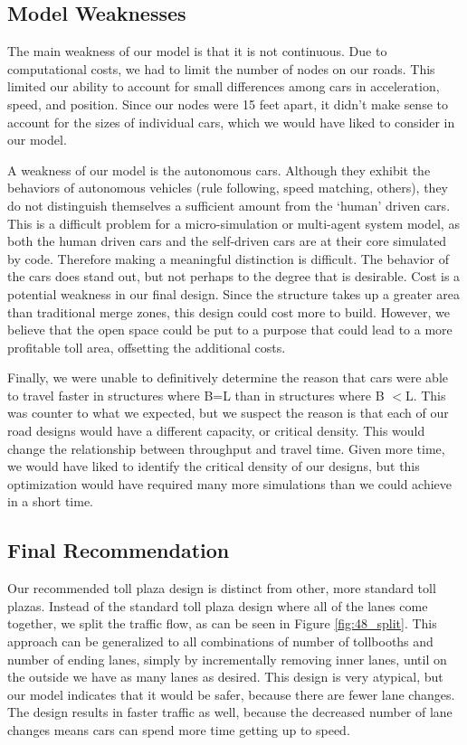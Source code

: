 \documentclass[a4paper, 11pt]{article}
\begin{document}
\subsection{Model Weaknesses}
The main weakness of our model is that it is not continuous.  Due to computational costs, we had to limit the number of nodes on our roads. This limited our ability to account for small differences among cars in acceleration, speed, and position. Since our nodes were 15 feet apart, it didn't make sense to account for the sizes of individual cars, which we would have liked to consider in our model. 

%
%
%
%
%
%


A weakness of our model is the autonomous cars. Although they exhibit the behaviors of autonomous vehicles (rule following, speed matching, others), they do not distinguish themselves a sufficient amount from the `human' driven cars. This is a difficult problem for a micro-simulation or multi-agent system model, as both the human driven cars and the self-driven cars are at their core simulated by code. Therefore making a meaningful distinction is difficult. The behavior of the cars does stand out, but not perhaps to the degree that is desirable. 
%
%
%
%
%
Cost is a potential weakness in our final design. Since the structure takes up a greater area than traditional merge zones, this design could cost more to build. However, we believe that the open space could be put to a purpose that could lead to a more profitable toll area, offsetting the additional costs. 

Finally, we were unable to definitively determine the reason that cars were able to travel faster in structures where B=L than in structures where B $<$L. This was counter to what we expected, but we suspect the reason is that each of our road designs would have a different capacity, or critical density. This would change the relationship between throughput and travel time. Given more time, we would have liked to identify the critical density of our designs, but this optimization would have required many more simulations than we could achieve in a short time.  
\subsection{Final Recommendation}
\label{final_rec}

Our recommended toll plaza design is distinct from other, more standard toll plazas. Instead of the standard toll plaza design where all of the lanes come together, we split the traffic flow, as can be seen in Figure \ref{fig:48_split}. This approach can be generalized to all combinations of number of tollbooths and number of ending lanes, simply by incrementally removing inner lanes, until on the outside we have as many lanes as desired. This design is very atypical, but our model indicates that it would be safer, because there are fewer lane changes. The design results in faster traffic as well, because the decreased number of lane changes means cars can spend more time getting up to speed. 
\end{document}
